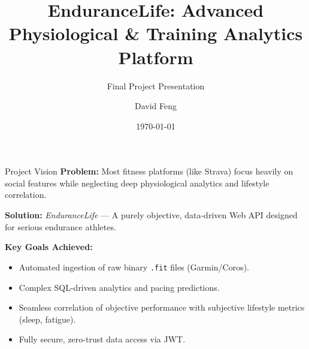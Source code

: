 \documentclass[mathserif,aspectratio=169]{beamer}
\title[EnduranceLife Web API]{EnduranceLife: Advanced Physiological \& Training Analytics Platform}
\subtitle{Final Project Presentation}
\author{David Feng}
\institute[University of Leeds]{School of Computing\\University of Leeds}
\date{\today}
\begin{document}
\begin{frame}
    \titlepage
\end{frame}

\begin{frame}{Project Vision}
    \textbf{Problem:} Most fitness platforms (like Strava) focus heavily on social features while neglecting deep physiological analytics and lifestyle correlation. 
    
    \vspace{0.5cm}
    \textbf{Solution:} \textit{EnduranceLife} --- A purely objective, data-driven Web API designed for serious endurance athletes.
    
    \vspace{0.3cm}
    \textbf{Key Goals Achieved:}
    \begin{itemize}
        \item Automated ingestion of raw binary \texttt{.fit} files (Garmin/Coros).
        \item Complex SQL-driven analytics and pacing predictions.
        \item Seamless correlation of objective performance with subjective lifestyle metrics (sleep, fatigue).
        \item Fully secure, zero-trust data access via JWT.
    \end{itemize}
\end{frame}
\end{document}
